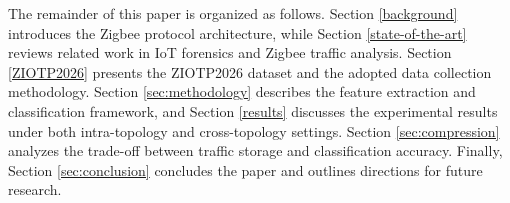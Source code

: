 
The remainder of this paper is organized as follows. 
Section \ref{background} introduces the Zigbee protocol architecture, while Section \ref{state-of-the-art} reviews related work in IoT forensics and Zigbee traffic analysis. 
Section \ref{ZIOTP2026} presents the ZIOTP2026 dataset and the adopted data collection methodology. 
Section \ref{sec:methodology} describes the feature extraction and classification framework, and Section \ref{results} discusses the experimental results under both intra-topology and cross-topology settings. 
Section \ref{sec:compression} analyzes the trade-off between traffic storage and classification accuracy. 
Finally, Section \ref{sec:conclusion} concludes the paper and outlines directions for future research.